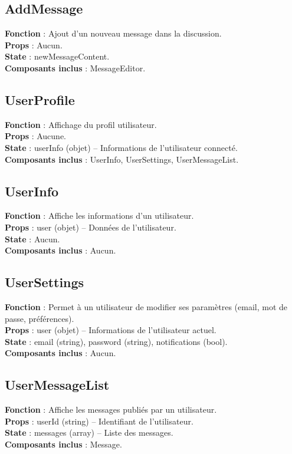 \documentclass{article}
\begin{document}
\subsection*{AddMessage}
\textbf{Fonction} : Ajout d'un nouveau message dans la discussion.\\
\textbf{Props} : Aucun.\\
\textbf{State} : newMessageContent.\\
\textbf{Composants inclus} : MessageEditor.

\subsection*{UserProfile}
\textbf{Fonction} : Affichage du profil utilisateur.\\
\textbf{Props} : Aucune.\\
\textbf{State} : userInfo (objet) – Informations de l'utilisateur connecté.\\
\textbf{Composants inclus} : UserInfo, UserSettings, UserMessageList.

\subsection*{UserInfo}
\textbf{Fonction} : Affiche les informations d’un utilisateur.\\
\textbf{Props} : user (objet) – Données de l’utilisateur.\\
\textbf{State} : Aucun.\\
\textbf{Composants inclus} : Aucun.

\subsection*{UserSettings}
\textbf{Fonction} : Permet à un utilisateur de modifier ses paramètres (email, mot de passe, préférences).\\
\textbf{Props} : user (objet) – Informations de l’utilisateur actuel.\\
\textbf{State} : email (string), password (string), notifications (bool).\\
\textbf{Composants inclus} : Aucun.

\subsection*{UserMessageList}
\textbf{Fonction} : Affiche les messages publiés par un utilisateur.\\
\textbf{Props} : userId (string) – Identifiant de l’utilisateur.\\
\textbf{State} : messages (array) – Liste des messages.\\
\textbf{Composants inclus} : Message.
\end{document}
